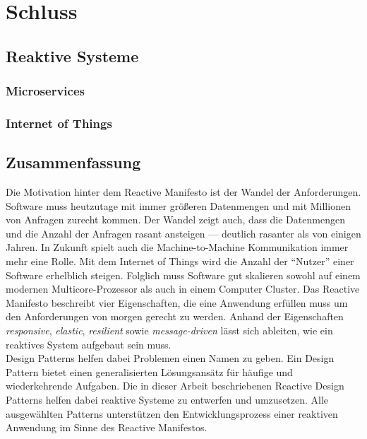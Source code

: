 \chapter{Schluss}

\section{Reaktive Systeme}
\subsection{Microservices}
\subsection{Internet of Things}

\section{Zusammenfassung}
Die Motivation hinter dem Reactive Manifesto ist der Wandel der Anforderungen. Software muss heutzutage mit immer größeren Datenmengen und mit Millionen von Anfragen zurecht kommen. Der Wandel zeigt auch, dass die Datenmengen und die Anzahl der Anfragen rasant ansteigen --- deutlich rasanter als von einigen Jahren. In Zukunft spielt auch die Machine-to-Machine Kommunikation immer mehr eine Rolle. Mit dem Internet of Things wird die Anzahl der \enquote{Nutzer} einer Software erhelblich steigen. Folglich muss Software gut skalieren sowohl auf einem modernen Multicore-Prozessor als auch in einem Computer Cluster. Das Reactive Manifesto beschreibt vier Eigenschaften, die eine Anwendung erfüllen muss um den Anforderungen von morgen gerecht zu werden. Anhand der Eigenschaften \textit{responsive}, \textit{elastic}, \textit{resilient} sowie \textit{message-driven} lässt sich ableiten, wie ein reaktives System aufgebaut sein muss.\\
Design Patterns helfen dabei Problemen einen Namen zu geben. Ein Design Pattern bietet einen generalisierten Lösungsansätz für häufige und wiederkehrende Aufgaben. Die in dieser Arbeit beschriebenen Reactive Design Patterns helfen dabei reaktive Systeme zu entwerfen und umzusetzen. Alle ausgewählten Patterns unterstützen den Entwicklungsprozess einer reaktiven Anwendung im Sinne des Reactive Manifestos.\\
